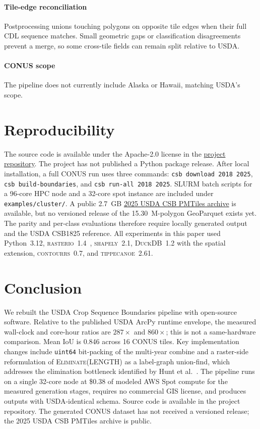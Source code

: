 \documentclass[preprint,12pt]{elsarticle}
\begin{document}
\paragraph{Tile-edge reconciliation} Postprocessing unions touching polygons
on opposite tile edges when their full CDL sequence matches. Small geometric
gaps or classification disagreements prevent a merge, so some cross-tile
fields can remain split relative to USDA.

\paragraph{CONUS scope} The pipeline does not currently include
Alaska or Hawaii, matching USDA's scope.

\section{Reproducibility}
\label{sec:reproducibility}

The source code is available under the Apache-2.0 license in the
\href{https://github.com/isaaccorley/crop-sequence-boundaries-v2}{project
repository}. The project has not published a Python package release. After
local installation, a full CONUS run uses three
commands: \texttt{csb download 2018 2025}, \texttt{csb build-boundaries},
and \texttt{csb run-all 2018 2025}. SLURM batch scripts for a 96-core
HPC node and a 32-core spot instance are included under
\texttt{examples/cluster/}. A public 2.7~GB
\href{https://source.coop/ftw/usda-csb}{2025 USDA CSB PMTiles archive} is
available, but no versioned release of the 15.30~M-polygon GeoParquet exists
yet. The parity and per-class evaluations therefore require locally generated
output and the USDA CSB1825 reference.
All experiments in this paper used Python~3.12,
\textsc{rasterio}~1.4~\cite{rasterio}, \textsc{shapely}~2.1,
\textsc{DuckDB}~1.2 with
the spatial extension, \textsc{contourrs}~0.7, and \textsc{tippecanoe}~2.61.

\section{Conclusion}

We rebuilt the USDA Crop Sequence Boundaries pipeline with open-source
software. Relative to the published USDA ArcPy runtime envelope, the measured
wall-clock and core-hour ratios are $287\times$ and $860\times$; this is not a
same-hardware comparison. Mean IoU is 0.846 across 16 CONUS tiles. Key
implementation changes include
\texttt{uint64} bit-packing of the multi-year combine and a raster-side
reformulation of \textsc{Eliminate(LENGTH)} as a label-graph union-find,
which addresses the elimination bottleneck identified by
Hunt et al.~\cite{hunt2024csb}. The pipeline runs on a single 32-core node at
\$0.38 of modeled AWS Spot compute for the measured generation stages,
requires no commercial GIS license, and produces outputs with USDA-identical
schema. Source code is available in the project repository. The generated
CONUS dataset has not received a versioned release; the 2025 USDA CSB PMTiles
archive is public.
\end{document}
